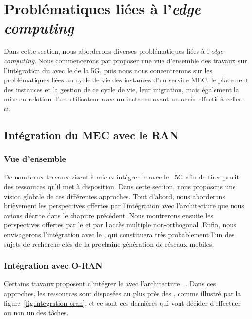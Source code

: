 \documentclass[../main.tex]{subfiles}
\begin{document}
\section{Problématiques liées à l’\textit{edge computing}}
Dans cette section, nous aborderons diverses problématiques liées à l’\textit{edge computing}. Nous commencerons par proposer une vue d’ensemble des travaux sur l’intégration du  avec le  de la 5G, puis nous nous concentrerons sur les problématiques liées au cycle de vie des instances d’un service MEC: le placement des instances et la gestion de ce cycle de vie, leur migration, mais également la mise en relation d’un utilisateur avec un instance avant un accès effectif à celles-ci.

\subsection{Intégration du MEC avec le RAN}
\subsubsection{Vue d’ensemble}
De nombreux travaux visent à mieux intégrer le  avec le ~5G afin de tirer profit des ressources qu’il met à disposition.
Dans cette section, nous proposons une vision globale de ces différentes approches. Tout d’abord, nous aborderons brièvement les perspectives offertes par l’intégration avec l’architecture  que nous avions décrite dans le chapitre précédent. Nous montrerons ensuite les perspectives offertes par le  et par l’accès multiple non-orthogonal.
Enfin, nous envisagerons l’intégration avec le  , qui constituera très probablement l’un des sujets de recherche clés de la prochaine génération de réseaux mobiles.

\pagebreak
\subsubsection{Intégration avec O-RAN}
Certains travaux proposent d’intégrer le  avec l’architecture ~\cite{10.1109/MNET.2020.9277891,10.1109/WCNC57260.2024.10571112}.
Dans ces approches, les ressources  sont disposées au plus près des , comme illustré par la figure~\ref{fig:integration-oran}, et ce sont ces dernières qui vont décider d’effectuer ou non un  des tâches.
\end{document}
